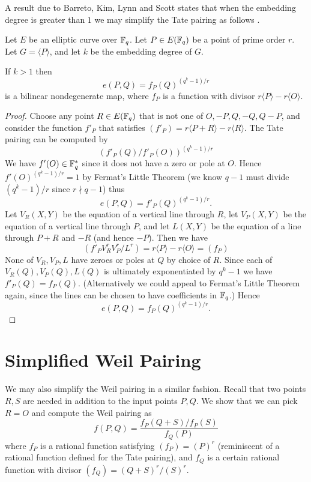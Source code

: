A result due to Barreto, Kim, Lynn and Scott states that
when the embedding degree is greater than $1$ we may simplify
the Tate pairing as follows \cite{bakls, bals2}.

\begin{theorem}
Let $E$ be an elliptic curve over $\mathbb{F}_q$.
Let $P \in E(\mathbb{F}_q)$ be a point of prime order $r$.
Let $G = \langle P \rangle$, and let $k$ be the embedding degree of $G$.

If $k > 1$ then
\[
e(P,Q) = f_P(Q)^{(q^k-1)/r}
\]
is a bilinear nondegenerate map,
where $f_P$ is a function with divisor $r\langle P\rangle - r\langle O\rangle$.
\end{theorem}

\begin{proof}
Choose any point $R \in E(\mathbb{F}_q)$ that is not one of
$O, -P, Q, -Q, Q - P$,
and consider the function $f'_P$ that satisfies $(f'_P) = r\langle P+R\rangle
- r\langle R \rangle$.
The Tate pairing can be computed by
\[
(f'_P(Q)/f'_P(O))^{(q^k-1)/r}
\]
We have $f'(O) \in \mathbb{F}_q^*$ since it does not have a zero or pole
at $O$. Hence
$f'(O)^{(q^k-1)/r} = 1$ by Fermat's Little Theorem (we know $q-1$ must
divide $(q^k - 1)/r$ since $r\nmid q-1$) thus
\[ e(P,Q) = f'_P(Q)^{(q^k-1)/r} . \]
Let $V_R(X,Y)$ be the equation of a vertical line through $R$,
let $V_P(X,Y)$ be the equation of a vertical line through $P$,
and let $L(X,Y)$ be the equation of a line through $P+R$ and $-R$ (and hence
$-P$).
Then we have
\[ (f'_P V_R^r V_P^r / L^r) = r \langle P \rangle - r \langle O \rangle
= (f_P) \]
None of $V_R, V_P, L$ have zeroes or poles at $Q$ by choice of $R$.
Since each of $V_R(Q), V_P(Q), L(Q)$ is ultimately exponentiated by $q^k-1$
we have $f'_P(Q) = f_P(Q)$.
(Alternatively we could appeal to Fermat's Little Theorem
again, since the lines can be chosen to have coefficients in $\mathbb{F}_q$.)
Hence
\[e(P,Q) = f_P(Q)^{(q^k-1)/r} . \]
\end{proof}

\section {Simplified Weil Pairing}

We may also simplify the Weil pairing in a similar fashion.
Recall that two points $R, S$ are needed in addition to the input points
$P,Q$. We show that we can pick $R = O$ and compute the Weil pairing as
\[ f(P,Q) = \frac{f_P(Q+S)/f_P(S)}{f_Q(P)} \]
where $f_P$ is a rational function
satisfying $(f_P) = (P)^r$ (reminiscent of a rational function defined
for the Tate pairing),
and $f_Q$ is a certain rational function with divisor
$(f_Q) = (Q+S)^r /(S)^r$.

